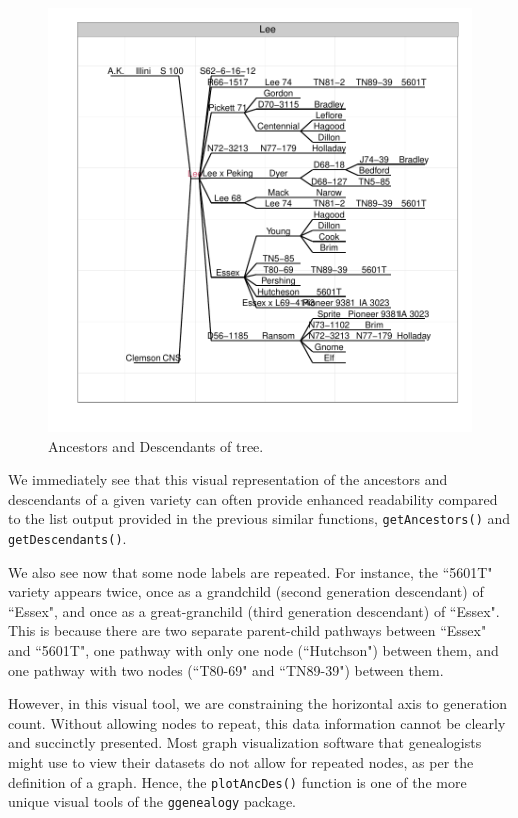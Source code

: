 \documentclass{article}
\numberwithin{equation}{section} %
\newcommand{\pkg}[1]{{\texttt{#1}}}
\begin{document}
\begin{figure} 
  \begin{center} 
\includegraphics{ggenealogy-plotAncDes1}
\end{center} 
\caption{Ancestors and Descendants of tree.}
\label{fig:plotAncDes1}
\end{figure}

We immediately see that this visual representation of the ancestors and descendants of a given variety can often provide enhanced readability compared to the list output provided in the previous similar functions, \texttt{getAncestors()} and \texttt{getDescendants()}.

We also see now that some node labels are repeated. For instance, the ``5601T" variety appears twice, once as a grandchild (second generation descendant) of ``Essex", and once as a great-granchild (third generation descendant) of ``Essex". This is because there are two separate parent-child pathways between ``Essex" and ``5601T", one pathway with only one node (``Hutchson") between them, and one pathway with two nodes (``T80-69" and ``TN89-39") between them.

However, in this visual tool, we are constraining the horizontal axis to generation count. Without allowing nodes to repeat, this data information cannot be clearly and succinctly presented. Most graph visualization software that genealogists might use to view their datasets do not allow for repeated nodes, as per the definition of a graph. Hence, the \texttt{plotAncDes()} function is one of the more unique visual tools of the \pkg{ggenealogy} package.
\end{document}
